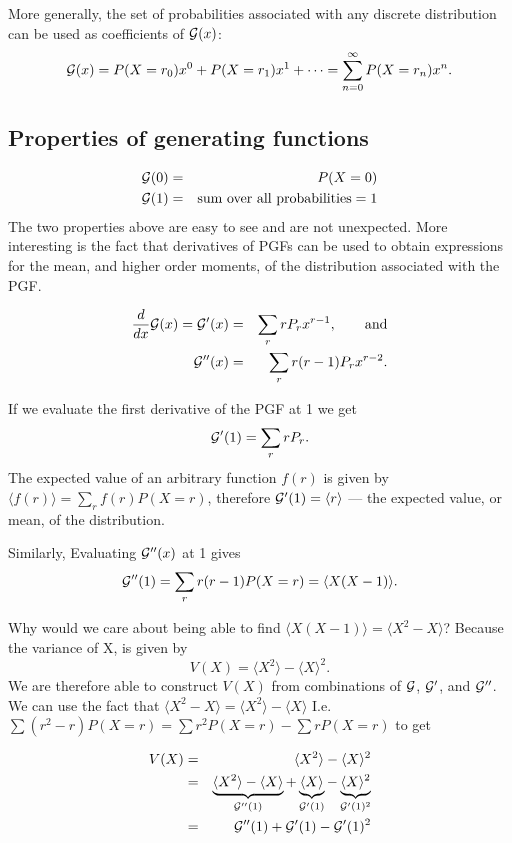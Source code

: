 More generally, the set of probabilities associated with any discrete distribution can be used as coefficients of $\mathcal{G}(x)$:
$$\mathcal{G}(x) = P(X=r_0)x^0+P(X=r_1)x^1+\cdots = \sum_{n=0}^\infty P(X=r_n)x^n.$$

\subsection{Properties of generating functions}
\begin{eqnarray*}
	\mathcal{G}(0)&=&P(X=0)\\
	\mathcal{G}(1)&=&\text{sum over all probabilities}=1
\end{eqnarray*}
The two properties above are easy to see and are not unexpected. More interesting is the fact that derivatives of PGFs can be used to obtain expressions for the mean, and higher order moments, of the distribution associated with the PGF.

\begin{eqnarray*}
	\frac{d}{dx}\mathcal{G}(x)=\mathcal{G}'(x)&=&\sum_r rP_r x^{r-1},\qquad\text{and}\\
	\mathcal{G}''(x)&=&\sum_r r(r-1)P_rx^{r-2}.
\end{eqnarray*}

If we evaluate the first derivative of the PGF at 1 we get
$$\mathcal{G}'(1) = \sum_r rP_r.$$
The expected value of an arbitrary function $f(r)$ is given by $\langle f(r)\rangle = \sum_r f(r) P(X=r)$, therefore $\mathcal{G}'(1) = \langle r\rangle$ --- the expected value, or mean, of the distribution.

Similarly,  Evaluating $\mathcal{G}''(x)$ at 1 gives 
$$\mathcal{G}''(1) = \sum_r r(r-1)P(X=r) = \langle X(X-1)\rangle.$$

Why would we care about being able to find $\langle X(X-1)\rangle = \langle X^2 -X\rangle$? Because the variance of X, is given by 
$$ V(X) = \langle X^2\rangle -\langle X\rangle^2.$$ We are therefore able to construct $V(X)$ from combinations of $\mathcal{G}$, $\mathcal{G}'$, and $\mathcal{G}''$.
We can use the fact that $\langle X^2 -X\rangle =\langle X^2\rangle-\langle X\rangle$ I.e. $\sum(r^2-r)P(X=r)=\sum r^2P(X=r)-\sum rP(X=r)$ to get

\begin{eqnarray}
V(X)&=&\langle X^2\rangle - \langle X\rangle^2\\
&=&\underbrace{\langle X^2\rangle -  \langle X \rangle}_{\mathcal{G}''(1)} + \underbrace{\langle X\rangle}_{\mathcal{G}'(1)} - \underbrace{\langle X \rangle^2}_{\mathcal{G}'(1)^2}\\
&=& \mathcal{G}''(1) +\mathcal{G}'(1)-\mathcal{G}'(1)^2 \label{eq:binvar}
\end{eqnarray}

